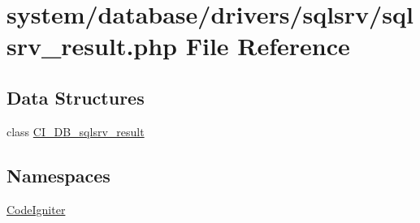 \hypertarget{sqlsrv__result_8php}{\section{system/database/drivers/sqlsrv/sqlsrv\-\_\-result.php File Reference}
\label{sqlsrv__result_8php}
}
\subsection*{Data Structures}
\begin{DoxyCompactItemize}
\item 
class \hyperlink{class_c_i___d_b__sqlsrv__result}{C\-I\-\_\-\-D\-B\-\_\-sqlsrv\-\_\-result}
\end{DoxyCompactItemize}
\subsection*{Namespaces}
\begin{DoxyCompactItemize}
\item 
\hyperlink{namespace_code_igniter}{Code\-Igniter}
\end{DoxyCompactItemize}
